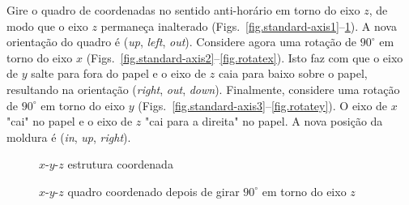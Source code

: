 Gire o quadro de coordenadas no sentido anti-horário em torno do eixo $z$, de modo que o eixo $z$ permaneça inalterado (Figs.~\ref{fig.standard-axis1}--\ref{fig.rotatez}). A nova orientação do quadro é (\textit{up}, \textit{left}, \textit{out}). Considere agora uma rotação de $90^\circ$ em torno do eixo $x$ (Figs.~\ref{fig.standard-axis2}--\ref{fig.rotatex}). Isto faz com que o eixo de $y$ salte para fora do papel e o eixo de $z$ caia para baixo sobre o papel, resultando na orientação (\textit{right}, \textit{out}, \textit{down}). Finalmente, considere uma rotação de $90^\circ$ em torno do eixo $y$ (Figs.~\ref{fig.standard-axis3}--\ref{fig.rotatey}). O eixo de $x$ "cai" no papel e o eixo de $z$ "cai para a direita" no papel. A nova posição da moldura é (\textit{in}, \textit{up}, \textit{right}).

\begin{figure}
\begin{minipage}{.48\textwidth}
\caption{$x$-$y$-$z$ estrutura coordenada}\label{fig.standard-axis1}
\end{minipage}
\hspace{\fill}
\begin{minipage}{.48\textwidth}
\caption{$x$-$y$-$z$ quadro coordenado depois de girar $90^\circ$ em torno do eixo $z$}\label{fig.rotatez}
\end{minipage}
\end{figure}



